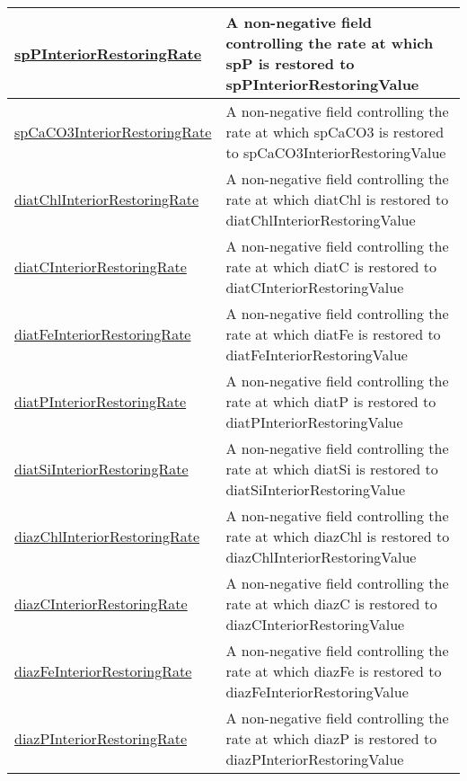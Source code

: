 {\begin{center}
\begin{longtable}{| p{2.0in} | p{4.0in} |}
    \hline
    \hyperref[subsec:var_sec_forcing_spPInteriorRestoringRate]{spPInteriorRestoringRate} & A non-negative field controlling the rate at which spP is restored to spPInteriorRestoringValue \\
    \hline
    \hyperref[subsec:var_sec_forcing_spCaCO3InteriorRestoringRate]{spCaCO3InteriorRestoringRate} & A non-negative field controlling the rate at which spCaCO3 is restored to spCaCO3InteriorRestoringValue \\
    \hline
    \hyperref[subsec:var_sec_forcing_diatChlInteriorRestoringRate]{diatChlInteriorRestoringRate} & A non-negative field controlling the rate at which diatChl is restored to diatChlInteriorRestoringValue \\
    \hline
    \hyperref[subsec:var_sec_forcing_diatCInteriorRestoringRate]{diatCInteriorRestoringRate} & A non-negative field controlling the rate at which diatC is restored to diatCInteriorRestoringValue \\
    \hline
    \hyperref[subsec:var_sec_forcing_diatFeInteriorRestoringRate]{diatFeInteriorRestoringRate} & A non-negative field controlling the rate at which diatFe is restored to diatFeInteriorRestoringValue \\
    \hline
    \hyperref[subsec:var_sec_forcing_diatPInteriorRestoringRate]{diatPInteriorRestoringRate} & A non-negative field controlling the rate at which diatP is restored to diatPInteriorRestoringValue \\
    \hline
    \hyperref[subsec:var_sec_forcing_diatSiInteriorRestoringRate]{diatSiInteriorRestoringRate} & A non-negative field controlling the rate at which diatSi is restored to diatSiInteriorRestoringValue \\
    \hline
    \hyperref[subsec:var_sec_forcing_diazChlInteriorRestoringRate]{diazChlInteriorRestoringRate} & A non-negative field controlling the rate at which diazChl is restored to diazChlInteriorRestoringValue \\
    \hline
    \hyperref[subsec:var_sec_forcing_diazCInteriorRestoringRate]{diazCInteriorRestoringRate} & A non-negative field controlling the rate at which diazC is restored to diazCInteriorRestoringValue \\
    \hline
    \hyperref[subsec:var_sec_forcing_diazFeInteriorRestoringRate]{diazFeInteriorRestoringRate} & A non-negative field controlling the rate at which diazFe is restored to diazFeInteriorRestoringValue \\
    \hline
    \hyperref[subsec:var_sec_forcing_diazPInteriorRestoringRate]{diazPInteriorRestoringRate} & A non-negative field controlling the rate at which diazP is restored to diazPInteriorRestoringValue \\

\end{longtable}
\end{center}}
